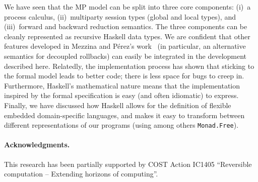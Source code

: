\documentclass[runningheads,plain]{llncs}
\begin{document}
We have seen that the MP model can be split into three core components: (i)~a process calculus, (ii)~multiparty
session types (global and local types), and (iii)~forward and backward reduction semantics. The three components can be cleanly represented as recursive Haskell data types. We are confident that other features developed in Mezzina and P\'{e}rez's work~\cite{DBLP:conf/ppdp/MezzinaP17} (in particular, an alternative semantics for decoupled rollbacks)
can easily be integrated in the development described here.
Relatedly, the implementation process has shown that sticking to the
formal model leads to better code; there is less space for bugs
to creep in. Furthermore, Haskell's mathematical nature means that the
implementation inspired by the formal specification is easy (and often
idiomatic) to express.
Finally, we have discussed how Haskell allows for the definition of flexible embedded
domain-specific languages, and makes it easy to transform between
different representations of our programs (using among others \texttt{Monad.Free}).








\paragraph{\textbf{Acknowledgments.}} 
This research has been partially supported by 
COST Action IC1405 ``Reversible computation -- Extending horizons of computing''.



%

\end{document}
